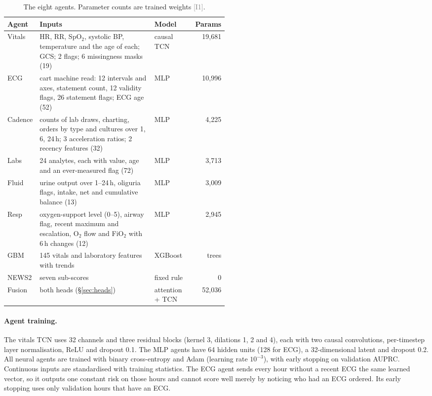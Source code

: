 \documentclass[11pt]{article}
\newcommand{\ev}[1]{\textcolor{gray}{\scriptsize[#1]}}   %
\begin{document}
\begin{table}[t]
\centering
\small
\caption{The eight agents. Parameter counts are trained weights
\ev{I1}.}\label{tab:agents}
\begin{tabular}{@{}l p{0.52\linewidth} l r@{}}
\toprule
Agent & Inputs & Model & Params \\
\midrule
Vitals & HR, RR, SpO$_2$, systolic BP, temperature and the age of each; GCS;
  2 flags; 6 missingness masks (19) & causal TCN & 19{,}681 \\
ECG & cart machine read: 12 intervals and axes, statement count, 12 validity
  flags, 26 statement flags; ECG age (52) & MLP & 10{,}996 \\
Cadence & counts of lab draws, charting, orders by type and cultures over 1, 6,
  24\,h; 3 acceleration ratios; 2 recency features (32) & MLP & 4{,}225 \\
Labs & 24 analytes, each with value, age and an ever-measured flag (72) & MLP
  & 3{,}713 \\
Fluid & urine output over 1--24\,h, oliguria flags, intake, net and cumulative
  balance (13) & MLP & 3{,}009 \\
Resp & oxygen-support level (0--5), airway flag, recent maximum and
  escalation, O$_2$ flow and FiO$_2$ with 6\,h changes (12) & MLP & 2{,}945 \\
GBM & 145 vitals and laboratory features with trends & XGBoost & trees \\
NEWS2 & seven sub-scores & fixed rule & 0 \\
\midrule
Fusion & both heads (\S\ref{sec:heads}) & attention + TCN & 52{,}036 \\
\bottomrule
\end{tabular}
\end{table}

\paragraph{Agent training.}
The vitals TCN uses 32 channels and three residual blocks (kernel 3,
dilations 1, 2 and 4), each with two causal convolutions, per-timestep layer
normalisation, ReLU and dropout 0.1. The MLP agents have 64 hidden units
(128 for ECG), a 32-dimensional latent and dropout 0.2. All neural agents are
trained with binary cross-entropy and Adam (learning rate $10^{-3}$), with
early stopping on validation AUPRC. Continuous inputs are standardised with
training statistics. The ECG agent sends every hour without a recent ECG the
same learned vector, so it outputs one constant risk on those hours and cannot
score well merely by noticing who had an ECG ordered. Its early stopping uses
only validation hours that have an ECG.
\end{document}
